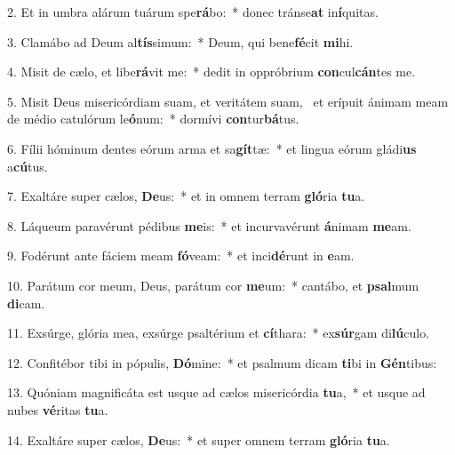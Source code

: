 2. Et in umbra alárum tuárum spe\textbf{rá}bo:~*  donec tránse\textbf{at} in\textbf{í}quitas.\

3. Clamábo ad Deum al\textbf{tís}simum:~*  Deum, qui bene\textbf{fé}cit \textbf{mi}hi.\

4. Misit de cælo, et libe\textbf{rá}vit me:~*  dedit in oppróbrium \textbf{con}cul\textbf{cán}tes me.\

5. Misit Deus misericórdiam suam, et veritátem suam, \dag\  et erípuit ánimam meam de médio catulórum le\textbf{ó}num:~*  dormívi \textbf{con}tur\textbf{bá}tus.\

6. Fílii hóminum dentes eórum arma et sa\textbf{gít}tæ:~*  et lingua eórum gládi\textbf{us} a\textbf{cú}tus.\

7. Exaltáre super cælos, \textbf{De}us:~*  et in omnem terram \textbf{gló}ria \textbf{tu}a.\

8. Láqueum paravérunt pédibus \textbf{me}is:~*  et incurvavérunt \textbf{á}nimam \textbf{me}am.\

9. Fodérunt ante fáciem meam \textbf{fó}veam:~*  et inci\textbf{dé}runt in \textbf{e}am.\

10. Parátum cor meum, Deus, parátum cor \textbf{me}um:~*  cantábo, et \textbf{psal}mum \textbf{di}cam.\

11. Exsúrge, glória mea, exsúrge psaltérium et \textbf{cí}thara:~*  ex\textbf{súr}gam di\textbf{lú}culo.\

12. Confitébor tibi in pópulis, \textbf{Dó}mine:~*  et psalmum dicam \textbf{ti}bi in \textbf{Gén}tibus:\

13. Quóniam magnificáta est usque ad cælos misericórdia \textbf{tu}a,~*  et usque ad nubes \textbf{vé}ritas \textbf{tu}a.\

14. Exaltáre super cælos, \textbf{De}us:~*  et super omnem terram \textbf{gló}ria \textbf{tu}a.\

